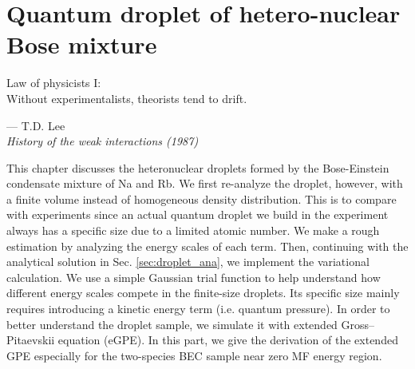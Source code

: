 \chapter{Quantum droplet of hetero-nuclear Bose mixture}
\label{Chap_droplet}

\setlength{\unitlength}{1pt}
\setlength{\epigraphwidth}{10cm}
\epigraph{Law of physicists I: \\ Without experimentalists, theorists tend to drift. \cite{Lee:1992ui}}{--- T.D. Lee\\ \textit{History of the weak interactions (1987)}}


This chapter discusses the heteronuclear droplets formed by the Bose-Einstein condensate mixture of Na and Rb. We first re-analyze the droplet, however, with a finite volume instead of homogeneous density distribution. This is to compare with experiments since an actual quantum droplet we build in the experiment always has a specific size due to a limited atomic number. We make a rough estimation by analyzing the energy scales of each term. Then, continuing with the analytical solution in Sec. \ref{sec:droplet_ana}, we implement the variational calculation. We use a simple Gaussian trial function to help understand how different energy scales compete in the finite-size droplets. Its specific size mainly requires introducing a kinetic energy term (i.e. quantum pressure). In order to better understand the droplet sample, we simulate it with extended Gross–Pitaevskii equation (eGPE). In this part, we give the derivation of the extended GPE especially for the two-species BEC sample near zero MF energy region.

